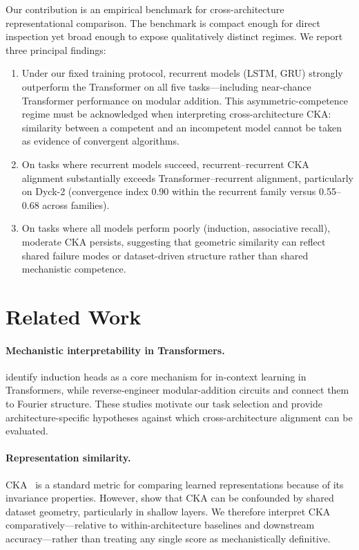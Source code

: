\documentclass{article}
\begin{document}
Our contribution is an empirical benchmark for cross-architecture 
representational comparison. The benchmark is compact enough for 
direct inspection yet broad enough to expose qualitatively 
distinct regimes. We report three principal findings:
\begin{enumerate}
    \item Under our fixed training protocol, recurrent models 
    (LSTM, GRU) strongly outperform the Transformer on all five 
    tasks---including near-chance Transformer performance on 
    modular addition. This asymmetric-competence regime must be 
    acknowledged when interpreting cross-architecture CKA: 
    similarity between a competent and an incompetent model 
    cannot be taken as evidence of convergent algorithms.
    \item On tasks where recurrent models succeed, 
    recurrent--recurrent CKA alignment substantially exceeds 
    Transformer--recurrent alignment, particularly on Dyck-2 
    (convergence index 0.90 within the recurrent family versus 
    0.55--0.68 across families).
    \item On tasks where all models perform poorly (induction, 
    associative recall), moderate CKA persists, suggesting that 
    geometric similarity can reflect shared failure modes or 
    dataset-driven structure rather than shared mechanistic 
    competence.
\end{enumerate}

\section{Related Work}
\label{sec:related}

\paragraph{Mechanistic interpretability in Transformers.}
\citet{olsson2022induction} identify induction heads as a core 
mechanism for in-context learning in Transformers, while 
\citet{nanda2023grokking} reverse-engineer modular-addition 
circuits and connect them to Fourier structure. These studies 
motivate our task selection and provide architecture-specific 
hypotheses against which cross-architecture alignment can be 
evaluated.

\paragraph{Representation similarity.}
CKA~\citep{kornblith2019similarity} is a standard metric for 
comparing learned representations because of its invariance 
properties. However, \citet{cui2022deconfounded} show that CKA can 
be confounded by shared dataset geometry, particularly in shallow 
layers. We therefore interpret CKA comparatively---relative to 
within-architecture baselines and downstream accuracy---rather 
than treating any single score as mechanistically definitive.
\end{document}
